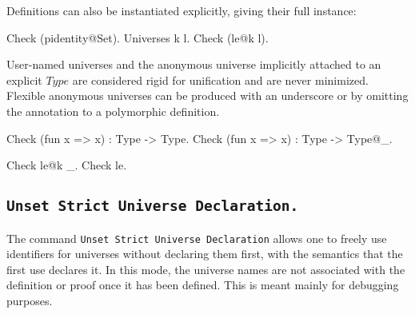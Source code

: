 Definitions can also be instantiated explicitly, giving their full instance:
\begin{coq_example}
Check (pidentity@{Set}).
Universes k l.
Check (le@{k l}).
\end{coq_example}

User-named universes and the anonymous universe implicitly attached to
an explicit $Type$ are considered rigid for unification and are never
minimized. Flexible anonymous universes can be produced with an
underscore or by omitting the annotation to a polymorphic definition.

\begin{coq_example}
  Check (fun x => x) : Type -> Type.
  Check (fun x => x) : Type -> Type@{_}.

  Check le@{k _}.
  Check le.
\end{coq_example}

\subsection{\tt Unset Strict Universe Declaration.
  \label{StrictUniverseDeclaration}}

The command \texttt{Unset Strict Universe Declaration} allows one to
freely use identifiers for universes without declaring them first, with
the semantics that the first use declares it. In this mode, the universe
names are not associated with the definition or proof once it has been
defined. This is meant mainly for debugging purposes.

